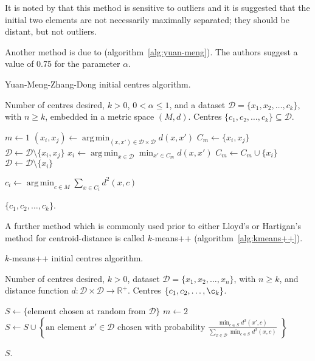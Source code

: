 \documentclass[a4paper]{report}
\DeclareMathOperator*{\argmin}{arg\,min}
\newcommand{\dset}{\mathcal{D}}
\begin{document}
It is noted by \citet{degroot1999selecting} that this method is sensitive to
outliers and it is suggested that the initial two elements are not necessarily
maximally separated; they should be distant, but not outliers.

Another method is due to \citet{yuan04initial}
(algorithm~\ref{alg:yuan-meng}).  The authors suggest a value of 0.75 for the
parameter $\alpha$.

\begin{algorithm}
  \caption{Yuan-Meng-Zhang-Dong initial centres algorithm.}
  \label{alg:yuan-meng}

  \begin{algorithmic}
    \Require Number of centres desired, $k > 0$, $0 < \alpha \leq 1$, and a
             dataset $\dset = \{x_1,x_2,\dotsc,c_k\}$, with $n \geq k$,
             embedded in a metric space $(M,d)$.
    \Ensure Centres $\{c_1,c_2,\dotsc,c_k\} \subseteq \dset$.

    \State $m \gets 1$
       \State $\displaystyle (x_i,x_j) \gets
               \argmin_{(x,x') \in \dset \times \dset} d(x,x')$
       \State $C_m \gets \{x_i,x_j\}$
       \State $\dset \gets \dset \setminus \{x_i,x_j\}$
          \State $\displaystyle x_i \gets
                  \argmin_{x \in \dset} \min_{x' \in C_m} d(x,x')$
          \State $C_m \gets C_m \cup \{x_i\}$
          \State $\dset \gets \dset \setminus \{x_i\}$
       \EndWhile
    \EndWhile

       \State $\displaystyle c_i \gets
               \argmin_{c \in M} \sum_{x \in C_i} d^2(x,c)$
    \EndFor

    \State \Return $\{c_1,c_2,\dotsc,c_k\}$.
  \end{algorithmic}
\end{algorithm}

A further method which is commonly used prior to either Lloyd's or Hartigan's
method for centroid-distance is called $k$-means++
(algorithm~\ref{alg:kmeans++}).

\begin{algorithm}
  \caption{$k$-means++ initial centres algorithm.}
  \label{alg:kmeans++}

  \begin{algorithmic}
    \Require Number of centres desired, $k > 0$, dataset $\dset =
             \{x_1,x_2,\dotsc,x_n\}$, with $n \geq k$, and distance function
             $d \colon \dset \times \dset \to \mathbb{R}^+$.
    \Ensure Centres $\{c_1,c_2,\dotsc,\c_k\}$.

    \State $S \gets \{\text{element chosen at random from $\dset$}\}$
    \State $m \gets 2$
       \State $\displaystyle S \gets S \cup
               \left\{\text{an element $x' \in \dset$ chosen with probability
                            $\frac{\displaystyle \min_{c \in S} d^2(x',c)}
                             {\displaystyle
                              \sum_{x \in \dset} \min_{c \in S} d^2(x,c)}$
                            }\right\}$
    \EndWhile

    \State \Return $S$.
  \end{algorithmic}
\end{algorithm}
\end{document}
